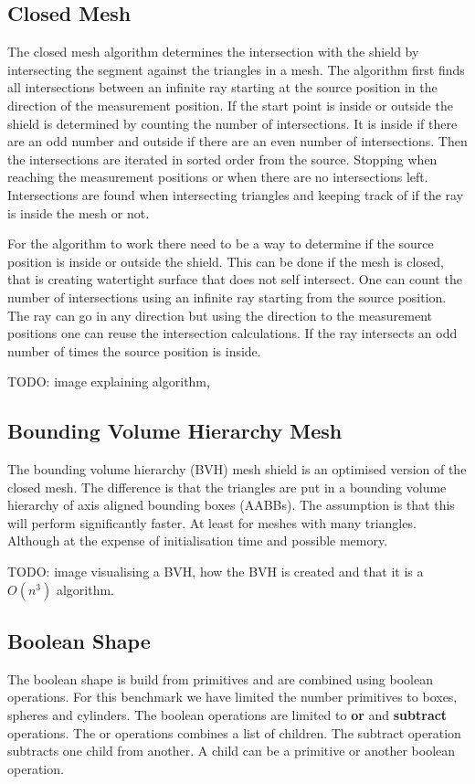 \documentclass[11pt,twoside,a4paper]{report}
\begin{document}
\subsection{Closed Mesh}
The closed mesh algorithm determines the intersection with the shield by intersecting the segment against the triangles in a mesh. The algorithm first finds all intersections between an infinite ray starting at the source position in the direction of the measurement position. If the start point is inside or outside the shield is determined by counting the number of intersections. It is inside if there are an odd number and outside if there are an even number of intersections. Then the intersections are iterated in sorted order from the source. Stopping when reaching the measurement positions or when there are no intersections left. Intersections are found when intersecting triangles and keeping track of if the ray is inside the mesh or not.

For the algorithm to work there need to be a way to determine if the source position is inside or outside the shield. This can be done if the mesh is closed, that is creating watertight surface that does not self intersect. One can count the number of intersections using an infinite ray starting from the source position. The ray can go in any direction but using the direction to the measurement positions one can reuse the intersection calculations. If the ray intersects an odd number of times the source position is inside.


TODO: image explaining algorithm,

\subsection{Bounding Volume Hierarchy Mesh}
The bounding volume hierarchy (BVH) mesh shield is an optimised version of the closed mesh. The difference is that the triangles are put in a bounding volume hierarchy of axis aligned bounding boxes (AABBs). The assumption is that this will perform significantly faster. At least for meshes with many triangles. Although at the expense of initialisation time and possible memory.

TODO: image visualising a BVH, how the BVH is created and that it is a $O(n^3)$ algorithm.

\subsection{Boolean Shape}
The boolean shape is build from primitives and are combined using boolean operations. For this benchmark we have limited the number primitives to boxes, spheres and cylinders. The boolean operations are limited to \textbf{or} and \textbf{subtract} operations. The or operations combines a list of children. The subtract operation subtracts one child from another. A child can be a primitive or another boolean operation.
\end{document}
